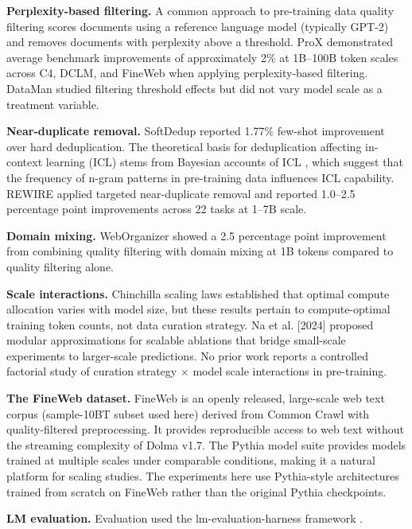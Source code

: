 
\textbf{Perplexity-based filtering.} A common approach to pre-training data quality filtering scores documents using a reference language model (typically GPT-2) and removes documents with perplexity above a threshold. ProX \citep{Zhou2024ProX} demonstrated average benchmark improvements of approximately 2\% at 1B--100B token scales across C4, DCLM, and FineWeb when applying perplexity-based filtering. DataMan \citep{Peng2025DataMan} studied filtering threshold effects but did not vary model scale as a treatment variable.

\textbf{Near-duplicate removal.} SoftDedup \citep{He2024SoftDedup} reported 1.77\% few-shot improvement over hard deduplication. The theoretical basis for deduplication affecting in-context learning (ICL) stems from Bayesian accounts of ICL \citep{Xie2021Explanation}, which suggest that the frequency of n-gram patterns in pre-training data influences ICL capability. REWIRE \citep{Nguyen2025REWIRE} applied targeted near-duplicate removal and reported 1.0--2.5 percentage point improvements across 22 tasks at 1--7B scale.

\textbf{Domain mixing.} WebOrganizer \citep{Wettig2025Organize} showed a 2.5 percentage point improvement from combining quality filtering with domain mixing at 1B tokens compared to quality filtering alone.

\textbf{Scale interactions.} Chinchilla scaling laws \citep{Hoffmann2022Training} established that optimal compute allocation varies with model size, but these results pertain to compute-optimal training token counts, not data curation strategy. Na et al. [2024] proposed modular approximations for scalable ablations that bridge small-scale experiments to larger-scale predictions. No prior work reports a controlled factorial study of curation strategy $\times$ model scale interactions in pre-training.

\textbf{The FineWeb dataset.} FineWeb \citep{Penedo2025FineWeb2} is an openly released, large-scale web text corpus (sample-10BT subset used here) derived from Common Crawl with quality-filtered preprocessing. It provides reproducible access to web text without the streaming complexity of Dolma v1.7. The Pythia model suite \citep{Biderman2023Pythia} provides models trained at multiple scales under comparable conditions, making it a natural platform for scaling studies. The experiments here use Pythia-style architectures trained from scratch on FineWeb rather than the original Pythia checkpoints.

\textbf{LM evaluation.} Evaluation used the lm-evaluation-harness framework \citep{Gao2021Harness}.
